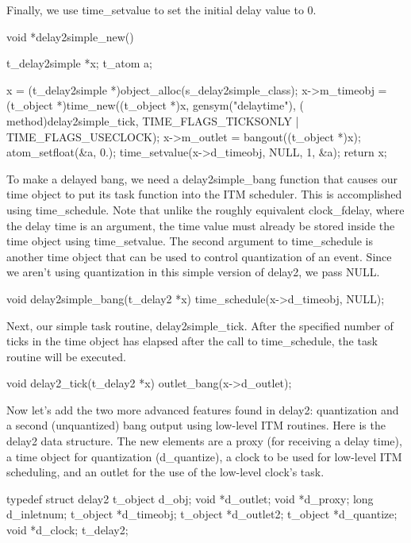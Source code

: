 Finally, we use time\_\-setvalue to set the initial delay value to 0. 
\begin{DoxyCode}
    void *delay2simple_new()
    {
        t_delay2simple *x;
        t_atom a;
 
        x = (t_delay2simple *)object_alloc(s_delay2simple_class);
        x->m_timeobj = (t_object *)time_new((t_object *)x, gensym("delaytime"), (
      method)delay2simple_tick, TIME_FLAGS_TICKSONLY | TIME_FLAGS_USECLOCK);
        x->m_outlet = bangout((t_object *)x);
        atom_setfloat(&a, 0.);
        time_setvalue(x->d_timeobj, NULL, 1, &a);
        return x;
    }
\end{DoxyCode}


To make a delayed bang, we need a delay2simple\_\-bang function that causes our time object to put its task function into the ITM scheduler. This is accomplished using time\_\-schedule. Note that unlike the roughly equivalent clock\_\-fdelay, where the delay time is an argument, the time value must already be stored inside the time object using time\_\-setvalue. The second argument to time\_\-schedule is another time object that can be used to control quantization of an event. Since we aren't using quantization in this simple version of delay2, we pass NULL. 
\begin{DoxyCode}
    void delay2simple_bang(t_delay2 *x)
    {
        time_schedule(x->d_timeobj, NULL);
    }
\end{DoxyCode}


Next, our simple task routine, delay2simple\_\-tick. After the specified number of ticks in the time object has elapsed after the call to time\_\-schedule, the task routine will be executed. 
\begin{DoxyCode}
    void delay2_tick(t_delay2 *x)
    {
        outlet_bang(x->d_outlet);
    }
\end{DoxyCode}


Now let's add the two more advanced features found in delay2: quantization and a second (unquantized) bang output using low-\/level ITM routines. Here is the delay2 data structure. The new elements are a proxy (for receiving a delay time), a time object for quantization (d\_\-quantize), a clock to be used for low-\/level ITM scheduling, and an outlet for the use of the low-\/level clock's task.


\begin{DoxyCode}
    typedef struct delay2
    {
        t_object d_obj;
        void *d_outlet;
        void *d_proxy;
        long d_inletnum;
        t_object *d_timeobj;
        t_object *d_outlet2;
        t_object *d_quantize;
        void *d_clock;
 } t_delay2;
\end{DoxyCode}


